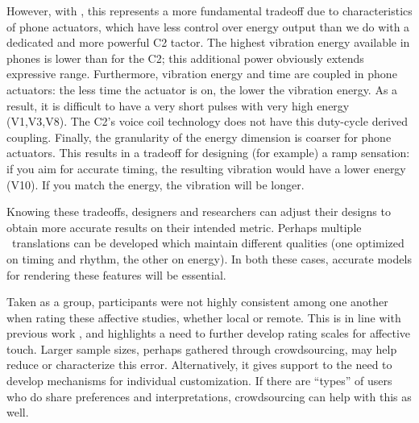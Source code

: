     However, with \lofi, this represents a more fundamental tradeoff due to characteristics of phone actuators, which have less control over energy output than we do with a dedicated and more powerful C2 tactor.
     The highest vibration energy available in phones is lower than for the C2;  this additional power obviously extends expressive range.
     Furthermore, vibration energy and time are coupled in phone actuators: the less time the actuator is on, the lower the vibration energy.
     As a result, it is difficult to have a very short pulses with very high energy (V1,V3,V8). The C2's voice coil technology does not have this duty-cycle derived coupling.
     Finally, the granularity of the energy dimension is coarser  for phone actuators.
     This results in a tradeoff for designing (for example) a ramp sensation: if you aim for accurate timing, the resulting vibration would have a lower energy (V10).
     If you match the energy, the vibration will be longer.
     
     Knowing these tradeoffs, designers and researchers can adjust their designs to obtain more accurate results on their intended metric. 
     Perhaps multiple \lofi\ translations can be developed which maintain different qualities (one optimized on timing and rhythm, the other on energy).
     In both these cases, accurate models for rendering these features will be essential.
        
        
		
   Taken as a group, participants were not highly consistent among one another when rating these %
   affective studies, whether local or remote.
  This is in line with previous work \cite{Seifi2015}, and highlights a need to further develop rating scales for affective touch.
   Larger sample sizes, perhaps gathered through crowdsourcing, may help reduce or characterize this error. Alternatively, it gives support to the need to develop mechanisms for individual customization. If there are ``types'' of users who do share preferences and interpretations, crowdsourcing can help with this as well.
   
